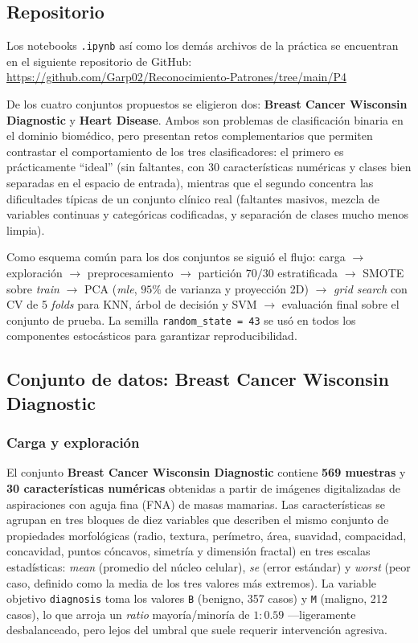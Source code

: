 \subsection{Repositorio}

Los notebooks \texttt{.ipynb} así como los demás archivos de la práctica
se encuentran en el siguiente repositorio de GitHub:
\hyperlink{P4}{\textcolor{iimasorange}{https://github.com/Garp02/Reconocimiento-Patrones/tree/main/P4}}

De los cuatro conjuntos propuestos se eligieron dos: \textbf{Breast Cancer
    Wisconsin Diagnostic} y \textbf{Heart Disease}. Ambos son problemas de
clasificación binaria en el dominio biomédico, pero presentan retos
complementarios que permiten contrastar el comportamiento de los tres
clasificadores: el primero es prácticamente ``ideal'' (sin faltantes, con
30 características numéricas y clases bien separadas en el espacio de
entrada), mientras que el segundo concentra las dificultades típicas de un
conjunto clínico real (faltantes masivos, mezcla de variables continuas y
categóricas codificadas, y separación de clases mucho menos limpia).

Como esquema común para los dos conjuntos se siguió el flujo: carga
$\to$ exploración $\to$ preprocesamiento $\to$ partición $70/30$
estratificada $\to$ SMOTE sobre \textit{train} $\to$ PCA (\textit{mle},
$95\%$ de varianza y proyección 2D) $\to$ \textit{grid search} con CV de
5 \textit{folds} para KNN, árbol de decisión y SVM $\to$ evaluación final
sobre el conjunto de prueba. La semilla \texttt{random\_state = 43} se usó
en todos los componentes estocásticos para garantizar reproducibilidad.


\subsection{Conjunto de datos: Breast Cancer Wisconsin Diagnostic}

\subsubsection*{Carga y exploración}

El conjunto \textbf{Breast Cancer Wisconsin Diagnostic} contiene
\textbf{569 muestras} y \textbf{30 características numéricas} obtenidas a
partir de imágenes digitalizadas de aspiraciones con aguja fina (FNA) de
masas mamarias. Las características se agrupan en tres bloques de diez
variables que describen el mismo conjunto de propiedades morfológicas
(radio, textura, perímetro, área, suavidad, compacidad, concavidad, puntos
cóncavos, simetría y dimensión fractal) en tres escalas estadísticas:
\textit{mean} (promedio del núcleo celular), \textit{se} (error estándar)
y \textit{worst} (peor caso, definido como la media de los tres valores
más extremos). La variable objetivo \texttt{diagnosis} toma los valores
\texttt{B} (benigno, 357 casos) y \texttt{M} (maligno, 212 casos), lo que
arroja un \textit{ratio} mayoría/minoría de $1{:}0{.}59$ ---ligeramente
desbalanceado, pero lejos del umbral que suele requerir intervención
agresiva.

